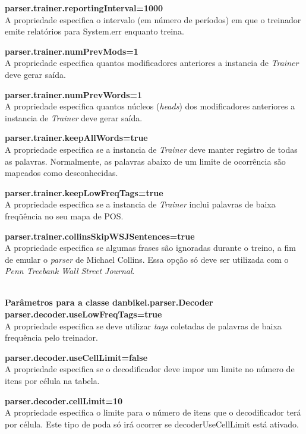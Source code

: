 \textbf{parser.trainer.reportingInterval=1000}\\
A propriedade especifica o intervalo (em número de períodos) em que o treinador emite relatórios para System.err enquanto treina.

\textbf{parser.trainer.numPrevMods=1}\\
A propriedade especifica quantos modificadores anteriores a instancia de \emph{Trainer} deve gerar saída.

\textbf{parser.trainer.numPrevWords=1}\\
A propriedade especifica quantos núcleos (\emph{heads}) dos modificadores anteriores a instancia de \emph{Trainer} deve gerar saída.

\textbf{parser.trainer.keepAllWords=true}\\
A propriedade especifica se a instancia de \emph{Trainer} deve manter registro de todas as palavras. Normalmente, as palavras abaixo de um limite de ocorrência são mapeados como desconhecidas.

\textbf{parser.trainer.keepLowFreqTags=true}\\
A propriedade especifica se a instancia de \emph{Trainer} inclui palavras de baixa freqüência no seu mapa de POS.

\textbf{parser.trainer.collinsSkipWSJSentences=true}\\
A propriedade especifica se algumas frases são ignoradas durante o treino, a fim de emular o \emph{parser} de Michael Collins. Essa opção só deve ser utilizada com o \emph{Penn Treebank Wall Street Journal}.

\HRule \\

\textbf{Parâmetros para a classe danbikel.parser.Decoder}\\

\textbf{parser.decoder.useLowFreqTags=true}\\
A propriedade especifica se deve utilizar \emph{tags} coletadas de palavras de baixa frequência pelo treinador.

\textbf{parser.decoder.useCellLimit=false}\\
A propriedade especifica se o decodificador deve impor um limite no número de itens por célula na tabela.

\textbf{parser.decoder.cellLimit=10}\\
A propriedade especifica o limite para o número de itens que o decodificador terá por célula. Este tipo de poda só irá ocorrer se decoderUseCellLimit está ativado.

